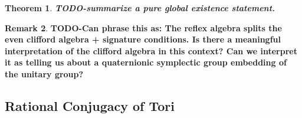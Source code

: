 \documentclass{article}
\theoremstyle{plain}
\newtheorem{theorem}{Theorem}[section]
\theoremstyle{definition}
\newtheorem{remark}[theorem]{Remark}
\numberwithin{equation}{section}
\newcommand{\TODO}[1]{\textbf{TODO-#1}}
\begin{document}
\begin{theorem}
\TODO{summarize a pure global existence statement.}
\end{theorem}

\begin{remark}
\TODO{Can phrase this as: The reflex algebra splits the even clifford algebra + signature conditions.
Is there a meaningful interpretation of the clifford algebra in this context?
Can we interpret it as telling us about a quaternionic symplectic group embedding of the unitary group?}
\end{remark}


\subsection{Rational Conjugacy of Tori}
\end{document}

